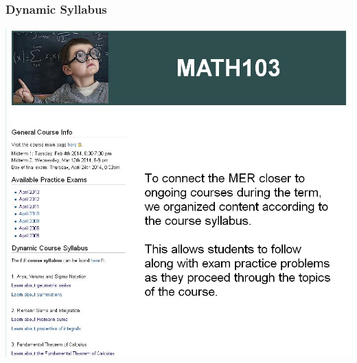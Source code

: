 \documentclass{beamer}
\begin{document}
\frame
{\frametitle{\bf{Dynamic Syllabus}}
\begin{center}
\includegraphics[scale = 0.3]{DynamicSyllabus.JPG}
\end{center}


}
\end{document}
